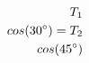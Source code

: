 \documentclass[preview]{standalone}
\begin{document}
\begin{align*}
\special{dvisvgm:raw <g id='unique000'>}T_1 \\cos(30^{\circ}) = T_2 \\cos(45^{\circ})\special{dvisvgm:raw </g>}
\end{align*}
\end{document}

